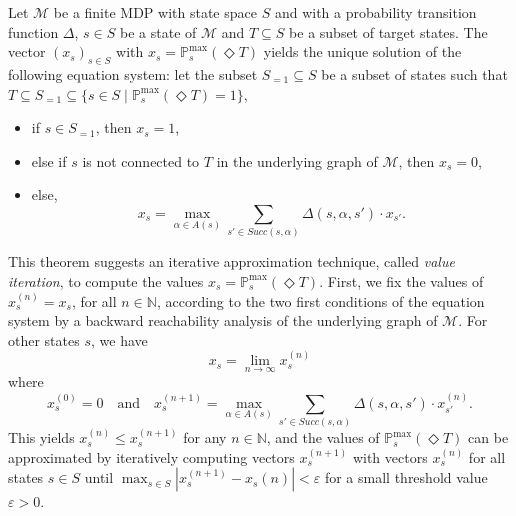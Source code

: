 \begin{theorem}
  Let $\mathcal{M}$ be a finite MDP with state space $S$ and with a probability transition function $\Delta$, $s \in S$ be a state of $\mathcal{M}$ and $T \subseteq S$ be a subset of target states. The vector $(x_s)_{s \in S}$ with $x_s = \mathbb{P}_s^{\max}(\Diamond T)$ yields the unique solution of the following equation system: let the subset $S_{=1} \subseteq S$ be a subset of states such that $T \subseteq S_{=1} \subseteq \{s \in S \; | \; \mathbb{P}^{\max}_s(\Diamond T) = 1 \}$,
  \begin{itemize}
    \item if $s \in S_{=1}$, then $x_s=1$,
    \item else if $s$ is not connected to $T$ in the underlying graph of $\mathcal{M}$, then $x_s=0$,
    \item else,
    \[ x_s = \max_{\alpha \in A(s)} \sum_{s' \in Succ(s, \alpha)} \Delta(s, \alpha, s') \cdot x_{s'}. \]
  \end{itemize}
\end{theorem}
This theorem suggests an iterative approximation technique, called \textit{value iteration}, to compute the values $x_s=\mathbb{P}^{\max}_s(\Diamond T)$. First, we fix the values of $x_s^{(n)} = x_s$, for all $n \in \mathbb{N}$, according to the two first conditions of the equation system by a backward reachability analysis of the underlying graph of $\mathcal{M}$. For other states $s$, we have
\[x_s = \lim_{n \rightarrow \infty} x_s^{(n)}\]
where
\[x_s^{(0)} = 0 \quad \text{and} \quad x_s^{(n+1)} = \max_{\alpha \in A(s)} \sum_{s' \in Succ(s, \alpha)} \Delta(s, \alpha, s') \cdot x_{s'}^{(n)}. \]
This yields $x_s^{(n)} \leq x_s^{(n+1)}$ for any $n \in \mathbb{N}$, and the values of $\mathbb{P}^{\max}_s(\Diamond T)$ can be approximated by iteratively computing vectors $x_s^{(n+1)}$
with vectors $x_s^{(n)}$ for all states $s \in S$ until $\max_{s \in S} |x_s^{(n+1)} - x_s{(n)}| < \varepsilon$ for a small threshold value $\varepsilon > 0$.
